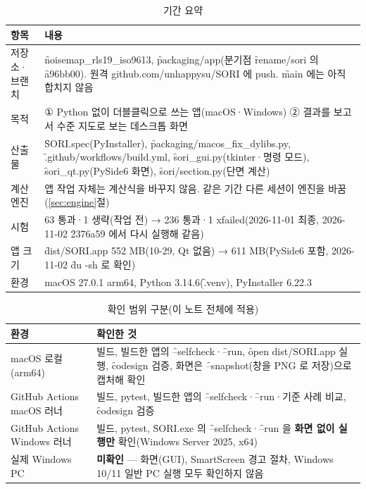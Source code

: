 \documentclass[10.5pt,a4paper]{article}
\begin{document}
\begin{table}[h]\centering\small
\caption{기간 요약}\label{tab:summary}
\begin{tabularx}{\textwidth}{P{30mm}L}
\toprule
항목 & 내용 \\ \midrule
저장소·브랜치 & \f{noisemap\_rls19\_iso9613}, \f{packaging/app}(분기점 \f{rename/sori} 의 \f{a96bb00}). 원격 github.com/unhappysu/SORI 에 push. \f{main} 에는 아직 합치지 않음 \\
목적 & ① Python 없이 더블클릭으로 쓰는 앱(macOS·Windows) ② 결과를 보고서 수준 지도로 보는 데스크톱 화면 \\
산출물 & \f{SORI.spec}(PyInstaller), \f{packaging/macos\_fix\_dylibs.py}, \f{.github/workflows/build.yml}, \f{sori\_gui.py}(tkinter·명령 모드), \f{sori\_qt.py}(PySide6 화면), \f{sori/section.py}(단면 계산) \\
계산 엔진 & 앱 작업 자체는 계산식을 바꾸지 않음. 같은 기간 다른 세션이 엔진을 바꿈(\ref{sec:engine}절) \\
시험 & 63 통과·1 생략(작업 전) → 236 통과·1 xfailed(2026-11-01 최종, 2026-11-02 \f{2376a59} 에서 다시 실행해 같음) \\
앱 크기 & \f{dist/SORI.app} 552 MB(10-29, Qt 없음) → 611 MB(PySide6 포함, 2026-11-02 \f{du -sh} 로 확인) \\
환경 & macOS 27.0.1 arm64, Python 3.14.6(\f{.venv}), PyInstaller 6.22.3 \\
\bottomrule
\end{tabularx}
\end{table}

\begin{table}[h]\centering\small
\caption{확인 범위 구분(이 노트 전체에 적용)}\label{tab:scope}
\begin{tabularx}{\textwidth}{P{28mm}L}
\toprule
환경 & 확인한 것 \\ \midrule
macOS 로컬(arm64) & 빌드, 빌드한 앱의 \f{--selfcheck}·\f{--run}, \f{open dist/SORI.app} 실행, \f{codesign} 검증, 화면은 \f{--snapshot}(창을 PNG 로 저장)으로 캡처해 확인 \\
GitHub Actions macOS 러너 & 빌드, pytest, 빌드한 앱의 \f{--selfcheck}·\f{--run}·기준 사례 비교, \f{codesign} 검증 \\
GitHub Actions Windows 러너 & 빌드, pytest, \f{SORI.exe} 의 \f{--selfcheck}·\f{--run} 을 \textbf{화면 없이 실행만} 확인(Windows Server 2025, x64) \\
실제 Windows PC & \textbf{미확인} — 화면(GUI), SmartScreen 경고 절차, Windows 10/11 일반 PC 실행 모두 확인하지 않음 \\
\bottomrule
\end{tabularx}
\end{table}
\end{document}
